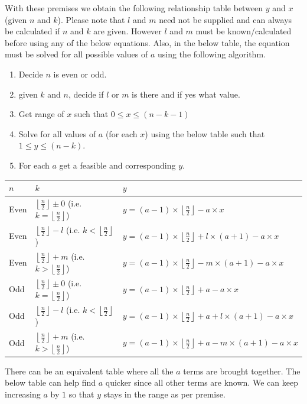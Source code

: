 \documentclass[10pt, twoside]{article}
\newcommand{\floordivision}[2]{\left\lfloor \frac{#1}{#2} \right\rfloor}
\begin{document}
With these premises we obtain the following relationship table between $y$ and $x$ (given $n$ and $k$). Please note that $l$ and $m$ need not be supplied and can always be calculated if $n$ and $k$ are given. However $l$ and $m$ must be known/calculated before using any of the below equations. Also, in the below table, the equation must be solved for all possible values of $\textbf{$a$}$ using the following algorithm.
\begin{enumerate}
    \item Decide $n$ is even or odd.
    \item given $k$ and $n$, decide if $l$ or $m$ is there and if yes what value.
    \item Get range of $x$ such that $0 \leq x \leq (n-k-1)$
    \item Solve for all values of $a$ (for each $x$) using the below table such that $1 \leq y \leq (n-k)$.
    \item For each $a$ get a feasible and corresponding $y$.
\end{enumerate}
\begin{tabular}{|l ||l ||l|}
	\hline
	\textbf{$n$} & \textbf{$k$} & \textbf{$y$} \\
	\hline
	\color{blue}
	Even & $\floordivision{n}{2} \pm 0$ \space(i.e. $k = \floordivision{n}{2}$) & $y = (a-1)\times \floordivision{n}{2} - a\times x$ \\
	\hline
	\color{blue}
	Even & $\floordivision{n}{2} - l$ \space(i.e. $k < \floordivision{n}{2}$) & $y = (a-1)\times \floordivision{n}{2} + l \times (a+1) - a\times x$ \\
	\hline
	\color{blue}
	Even & $\floordivision{n}{2} + m$ (i.e. $k > \floordivision{n}{2}$) & $y = (a-1)\times \floordivision{n}{2} - m \times (a+1) - a\times x$ \\
	\hline
	Odd & $\floordivision{n}{2} \pm 0$ \space(i.e. $k = \floordivision{n}{2}$) & $y = (a-1)\times \floordivision{n}{2} + a - a\times x$ \\
	\hline
	Odd & $\floordivision{n}{2} - l$ \space(i.e. $k < \floordivision{n}{2}$) & $y = (a-1)\times \floordivision{n}{2} + a + l\times(a+1) - a\times x$ \\
	\hline
	Odd & $\floordivision{n}{2} + m$ (i.e. $k > \floordivision{n}{2}$)  & $y = (a-1)\times \floordivision{n}{2} + a -m\times(a+1) - a\times x$ \\
	\hline
\end{tabular}


There can be an equivalent table where all the $a$ terms are brought together. The below table can help find $a$ quicker since all other terms are known. We can keep increasing $a$ by $1$ so that $y$ stays in the range as per premise.
\end{document}
